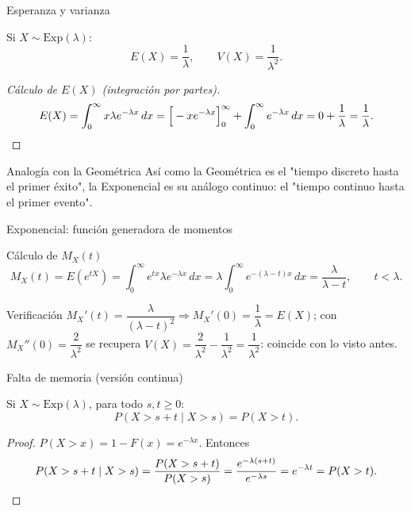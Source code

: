 \documentclass[aspectratio=169,11pt]{beamer}
\begin{document}
\begin{frame}{Esperanza y varianza}
\begin{theorem}
Si $X\sim\text{Exp}(\lambda)$:
$$E(X) = \frac{1}{\lambda}, \qquad V(X) = \frac{1}{\lambda^2}.$$
\end{theorem}

\begin{proof}[Cálculo de $E(X)$ (integración por partes)]
$$E(X) = \int_0^\infty x\lambda e^{-\lambda x}\,dx = \Big[-xe^{-\lambda x}\Big]_0^\infty + \int_0^\infty e^{-\lambda x}\,dx = 0 + \frac{1}{\lambda} = \frac{1}{\lambda}. \qedhere$$
\end{proof}

\begin{alertblock}{Analogía con la Geométrica}
Así como la Geométrica es el "tiempo discreto hasta el primer éxito", la Exponencial es su análogo continuo: el "tiempo continuo hasta el primer evento".
\end{alertblock}
\end{frame}

\begin{frame}{Exponencial: función generadora de momentos}
\begin{block}{Cálculo de $M_X(t)$}
$$M_X(t) = E(e^{tX}) = \int_0^\infty e^{tx}\lambda e^{-\lambda x}\,dx = \lambda\int_0^\infty e^{-(\lambda-t)x}\,dx = \frac{\lambda}{\lambda-t}, \qquad t<\lambda.$$
\end{block}

\begin{alertblock}{Verificación}
$M_X'(t) = \dfrac{\lambda}{(\lambda-t)^2} \Rightarrow M_X'(0)=\dfrac{1}{\lambda}=E(X)$; con $M_X''(0)=\dfrac{2}{\lambda^2}$ se recupera $V(X)=\dfrac{2}{\lambda^2}-\dfrac{1}{\lambda^2}=\dfrac{1}{\lambda^2}$: coincide con lo visto antes.
\end{alertblock}
\end{frame}

\begin{frame}{Falta de memoria (versión continua)}
\begin{theorem}
Si $X\sim\text{Exp}(\lambda)$, para todo $s,t\ge 0$:
$$P(X>s+t \mid X>s) = P(X>t).$$
\end{theorem}

\begin{proof}
$P(X>x) = 1-F(x) = e^{-\lambda x}$. Entonces
$$P(X>s+t\mid X>s) = \frac{P(X>s+t)}{P(X>s)} = \frac{e^{-\lambda(s+t)}}{e^{-\lambda s}} = e^{-\lambda t} = P(X>t). \qedhere$$
\end{proof}
\end{frame}
\end{document}
